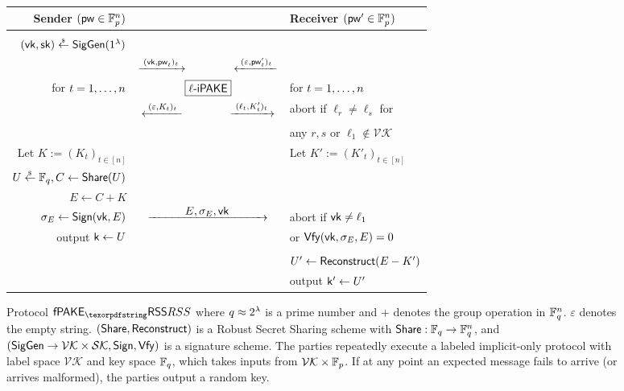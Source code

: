 \begin{center}
\begin{figure}[tbp]
  \centering
  \scriptsize
  \begin{fboxenv}
  \begin{tabular}{rcl}
     Sender $(\mathsf{pw}\in\mathbb{F}_{p}^{n})$ & & Receiver $(\mathsf{pw}'\in\mathbb{F}_{p}^{n})$ \\ \hline \\
     $(\mathsf{vk},\mathsf{sk})\stackrel{{}_\$}{\leftarrow}\mathsf{SigGen}(1^{\lambda})$ & &  \\
	   & $\xrightarrow{\;(\mathsf{vk},\mathsf{pw}_t)_t\;} \hspace{1.5cm} \xleftarrow{\;(\varepsilon,\mathsf{pw}'_t)_t\;}$ &  \\ 
	  for $t=1,\dots,n$ & $\fbox{\liPAKE}$& for $t=1,\dots,n$ \\ 
	    & $\xleftarrow{\;(\varepsilon,K_t)_t\;} \hspace{1.5cm} \xrightarrow{\;(\ell_t,K'_t)_t\;}$ &  abort if $\ell_r\neq\ell_s$ for\\ 
	   & & any $r,s$ or $\ell_1\notin\mathcal{VK}$ \\ 
	  Let $K:=(K_t)_{t\in[n]}$ & & Let $K':=(K'_t)_{t\in[n]}$\\
	  $U\stackrel{{}_\$}{\leftarrow} \mathbb{F}_q, C \gets \mathsf{Share}(U)$ & &  \\
	  $E \gets C + K$ &  & \\
	  $\sigma_E\gets\mathsf{Sign}(\mathsf{vk},E)$ & $\Rflow{E,\sigma_E,\vk}$  &  abort if $\mathsf{vk}\neq\ell_1$ \\  
	  output $\mathsf{k}\gets U$  & & or $\mathsf{Vfy}(\mathsf{vk},\sigma_E,E)=0$\\\\
	    &  & $U' \gets \mathsf{Reconstruct}(E-K')$\\
	   & & output $\mathsf{k}'\gets U'$
    \end{tabular}
  \end{fboxenv}
  \caption{Protocol $\PfakeRSS$ where $q\approx 2^{\lambda}$ is a prime number and $+$ denotes the group operation in $\mathbb{F}_q^{n}$. $\varepsilon$ denotes the empty string. $(\mathsf{Share},\mathsf{Reconstruct})$ is a Robust Secret Sharing scheme with $\mathsf{Share}:\mathbb{F}_q\rightarrow \mathbb{F}_q^{n}$, and $(\mathsf{SigGen}\rightarrow\mathcal{VK}\times\mathcal{SK},\mathsf{Sign},\mathsf{Vfy})$ is a signature scheme. The parties repeatedly execute a labeled implicit-only \PAKE protocol with label space $\mathcal{VK}$ and key space $\mathbb{F}_q$, which takes inputs from $\mathcal{VK}\times\mathbb{F}_{p}$. If at any point an expected message fails to arrive (or arrives malformed), the parties output a random key. }\label{fig:FAKERSS}
\vspace*{-1em}\end{figure}
\end{center}

